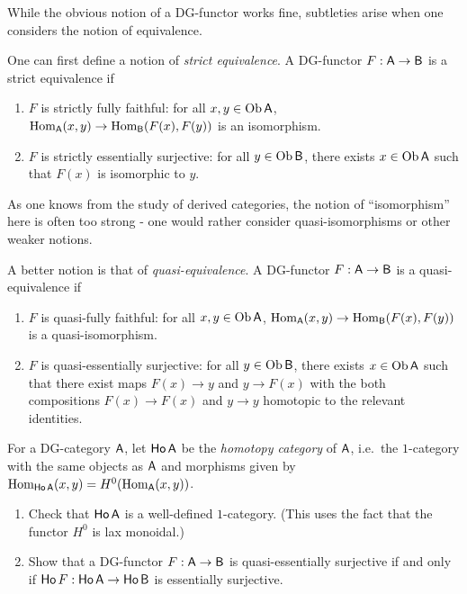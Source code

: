 \documentclass{amsart}
\begin{document}
\begin{rmk}
While the obvious notion of a DG-functor works fine, subtleties arise when one considers the notion of equivalence.

One can first define a notion of \emph{strict equivalence}.
A DG-functor $F: \mathsf{A} \to \mathsf{B}$ is a strict equivalence if
\begin{enumerate}
\item $F$ is strictly fully faithful: for all $x, y \in \operatorname{Ob} \mathsf{A}$, $\operatorname{Hom}_{\mathsf{A}}(x, y) \to \operatorname{Hom}_{\mathsf{B}}(F(x), F(y))$ is an isomorphism.
\item $F$ is strictly essentially surjective: for all $y \in \operatorname{Ob} \mathsf{B}$, there exists $x \in \operatorname{Ob} \mathsf{A}$ such that $F(x)$ is isomorphic to $y$.
\end{enumerate}
As one knows from the study of derived categories, the notion of ``isomorphism'' here is often too strong - one would rather consider quasi-isomorphisms or other weaker notions.

A better notion is that of \emph{quasi-equivalence}.
A DG-functor $F: \mathsf{A} \to \mathsf{B}$ is a quasi-equivalence if
\begin{enumerate}
	\item $F$ is quasi-fully faithful: for all $x, y \in \operatorname{Ob} \mathsf{A}$, $\operatorname{Hom}_{\mathsf{A}}(x, y) \to \operatorname{Hom}_{\mathsf{B}}(F(x), F(y))$ is a quasi-isomorphism.
	\item $F$ is quasi-essentially surjective: for all $y \in \operatorname{Ob} \mathsf{B}$, there exists $x \in \operatorname{Ob} \mathsf{A}$ such that there exist maps $F(x) \to y$ and $y \to F(x)$ with the both compositions $F(x) \to F(x)$ and $y \to y$ homotopic to the relevant identities.
\end{enumerate}
\end{rmk}

\begin{exer}
For a DG-category $\mathsf{A}$, let $\mathsf{Ho}\, \mathsf{A}$ be the \emph{homotopy category} of $\mathsf{A}$, i.e.\ the $1$-category with the same objects as $\mathsf{A}$ and morphisms given by $\operatorname{Hom}_{\mathsf{Ho}\, \mathsf{A}}(x, y) = H^0(\operatorname{Hom}_{\mathsf{A}}(x, y))$.
\begin{enumerate}
\item Check that $\mathsf{Ho}\, \mathsf{A}$ is a well-defined $1$-category. (This uses the fact that the functor $H^0$ is lax monoidal.)
\item Show that a DG-functor $F: \mathsf{A} \to \mathsf{B}$ is quasi-essentially surjective if and only if $\mathsf{Ho}\, F: \mathsf{Ho}\, \mathsf{A} \to \mathsf{Ho}\, \mathsf{B}$ is essentially surjective.
\end{enumerate}
\end{exer}
\end{document}
